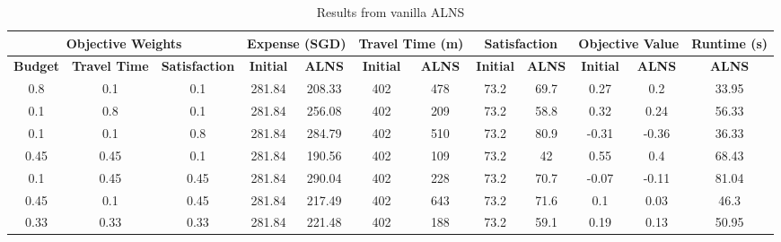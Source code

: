 \documentclass{ecai}
\begin{document}
\begin{table}[htbp]
    \centering
    \begin{adjustbox}{width=0.48\textwidth} %
    \begin{tabular}{|c|c|c|c|c|c|c|c|c|c|c|c|}
         \hline
         \multicolumn{3}{|c|}{\textbf{Objective Weights}} & \multicolumn{2}{c|}{\textbf{Expense (SGD)}} & \multicolumn{2}{c|}{\textbf{Travel Time (m)}} & \multicolumn{2}{c|}{\textbf{Satisfaction}} & \multicolumn{2}{c|}{\textbf{Objective Value}} & \textbf{Runtime (s)} \\
         \hline
         \textbf{Budget} & \textbf{Travel Time} & \textbf{Satisfaction} & \textbf{Initial} & \textbf{ALNS} & \textbf{Initial} & \textbf{ALNS} & \textbf{Initial} & \textbf{ALNS} & \textbf{Initial} & \textbf{ALNS} & \textbf{ALNS} \\
         \hline
         0.8 & 0.1 & 0.1 & 281.84 & 208.33 & 402 & 478 & 73.2 & 69.7 & 0.27 & 0.2 & 33.95 \\
         0.1 & 0.8 & 0.1 & 281.84 & 256.08 & 402 & 209 & 73.2 & 58.8 & 0.32 & 0.24 & 56.33 \\
         0.1 & 0.1 & 0.8 & 281.84 & 284.79 & 402 & 510 & 73.2 & 80.9 & -0.31 & -0.36 & 36.33 \\
         0.45 & 0.45 & 0.1 & 281.84 & 190.56 & 402 & 109 & 73.2 & 42 & 0.55 & 0.4 & 68.43 \\
         0.1 & 0.45 & 0.45 & 281.84 & 290.04 & 402 & 228 & 73.2 & 70.7 & -0.07 & -0.11 & 81.04 \\
         0.45 & 0.1 & 0.45 & 281.84 & 217.49 & 402 & 643 & 73.2 & 71.6 & 0.1 & 0.03 & 46.3 \\
         0.33 & 0.33 & 0.33 & 281.84 & 221.48 & 402 & 188 & 73.2 & 59.1 & 0.19 & 0.13 & 50.95 \\
         \hline
    \end{tabular}
    \end{adjustbox}
    \caption{Results from vanilla ALNS}
\end{table}
\vspace{-0.3cm}
\end{document}
